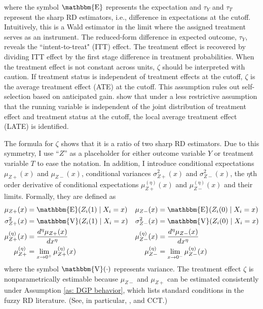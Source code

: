 \documentclass[12pt,]{article}
\DeclareMathOperator{\1}{\mathbbm{1}}
\DeclareMathOperator{\E}{\mathbbm{E}}
\DeclareMathOperator{\V}{\mathbbm{V}}
\begin{document}
where the symbol $\E$ represents the expectation and $\tau_Y$ and $\tau_T$ represent the sharp RD estimators, i.e., difference in expectations at the cutoff. Intuitively, this is a Wald estimator in the limit where the assigned treatment serves as an instrument. The reduced-form difference in expected outcome, $\tau_Y$, reveals the ``intent-to-treat" (ITT) effect. The treatment effect is recovered by dividing ITT effect by the first stage difference in treatment probabilities. When the treatment effect is not constant across units, $\zeta$ should be interpreted with caution. If treatment status is independent of treatment effects at the cutoff, $\zeta$ is the average treatment effect (ATE) at the cutoff. This assumption rules out self-selection based on anticipated gain. \cite{hahn2001identification} show that under a less restrictive assumption that the running variable is independent of the joint distribution of treatment effect and treatment status at the cutoff, the local average treatment effect (LATE) is identified.

The formula for $\zeta$ shows that it is a ratio of two sharp RD estimators. Due to this symmetry, I use ``$Z$'' as a placeholder for either outcome variable $Y$ or treatment variable $T$ to ease the notation. In addition, I introduce conditional expectations $\mu_{Z+}(x)$ and $\mu_{Z-}(x)$, conditional variances $\sigma_{Z+}^2(x)$ and $\sigma_{Z-}^2(x)$, the $\eta$th order derivative of conditional expectations $\mu_{Z+}^{(\eta)}(x)$ and $\mu_{Z-}^{(\eta)}(x)$ and their limits. Formally, they are defined as
\begin{align*}
	\mu_{Z+}(x) &= \E( Z_{i}(1) \mid X_{i}=x ) 
	&\mu_{Z-}(x) &= \E( Z_{i}(0) \mid X_{i}=x ) \\
	\sigma^{2}_{Z+}(x) &= \V( Z_{i}(1) \mid X_{i}=x )
	&\sigma^{2}_{Z-}(x) &=\V( Z_{i}(0) \mid X_{i}=x ) \\
	\mu_{Z+}^{(\eta)}(x) &=\frac{d^{\eta}\mu_{Z+}(x)}{dx^{\eta}}
	&\mu_{Z-}^{(\eta)}(x) &=\frac{d^{\eta}\mu_{Z-}(x)}{dx^{\eta}} \\
	\mu^{(\eta)}_{Z+} &= \lim_{x \rightarrow 0^{+}}\mu_{Z+}^{(\eta)}(x)
	&\mu^{(\eta)}_{Z-} &= \lim_{x \rightarrow 0^{-}}\mu_{Z-}^{(\eta)}(x)
\end{align*}
where the symbol $\V(\cdot)$ represents variance.  The treatment effect $\zeta$ is nonparametrically estimable because $\mu_{Z-}$ and $\mu_{Z+}$ can be estimated consistently under Assumption \ref{as: DGP behavior}, which lists standard conditions in the fuzzy RD literature. (See, in particular, \citealp{hahn2001identification}, \citealp{porter2003estimation} and CCT.)
\end{document}
